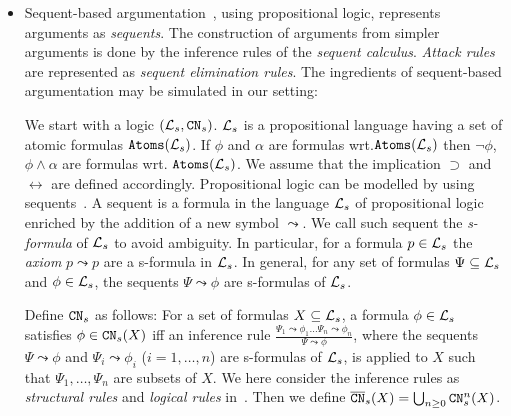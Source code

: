 \begin{itemize}



\item Sequent-based argumentation~\cite{ArieliS19}, using propositional logic, represents arguments as \emph{sequents}.
The construction of arguments from simpler arguments is done by the inference rules of the \emph{sequent calculus}.
\emph{Attack rules} are represented as \emph{sequent elimination rules}. 
The ingredients of sequent-based argumentation may be simulated in our setting:

We start with a logic $(\mathcal{L}_s, \texttt{\textup{CN}}_s)$. $\mathcal{L}_s$ is a propositional language having a set of atomic formulas $\texttt{\textup{Atoms}}(\mathcal{L}_s)$.  
If $\phi$ and $\alpha$ are formulas wrt.$\texttt{\textup{Atoms}}(\mathcal{L}_s)$ then $\neg \phi$, $\phi \wedge \alpha$ are formulas wrt. $\texttt{\textup{Atoms}}(\mathcal{L}_s)$. 
We assume that the implication $\supset$ and $\leftrightarrow$ are defined accordingly.
Propositional logic can be modelled by using sequents~\cite{ArieliS19}.
A sequent is a formula in the language $\mathcal{L}_s$ of propositional logic enriched by the addition of a new symbol $\leadsto$.
We call such sequent the \emph{s-formula} of $\mathcal{L}_s$ to avoid ambiguity.
In particular, for a formula $p \in \mathcal{L}_s$ the \emph{axiom} $p \leadsto p$ are a s-formula in $\mathcal{L}_s$. 
In general, for any set of formulas $\Psi \subseteq \mathcal{L}_s$ and $\phi \in \mathcal{L}_s$,  the sequents $\Psi \leadsto \phi$ are s-formulas of $\mathcal{L}_s$. %



Define $\texttt{\textup{CN}}_s$ as follows: 
For a set of formulas $X \subseteq \mathcal{L}_s$, a formula $\phi \in \mathcal{L}_s$ satisfies $\phi \in \texttt{\textup{CN}}_s(X)$ iff an inference rule
$\frac{\Psi_1 \leadsto \phi_1 \ldots \Psi_n \leadsto \phi_n}{\Psi \leadsto \phi}$, where the sequents $\Psi \leadsto \phi$ and $\Psi_i \leadsto \phi_i$ ($i = 1, \ldots, n$) are s-formulas of $\mathcal{L}_s$, is applied to $X$ such that $\Psi_1, \ldots, \Psi_n$ are subsets of $X$.
We here consider the inference rules as \emph{structural rules} and \emph{logical rules} in~\cite{ArieliS19}.
Then we define $\overline{\texttt{\textup{CN}}}_s(X) = \bigcup_{n \geq 0}\texttt{\textup{CN}}_{s}^{n}(X)$.




\end{itemize}
